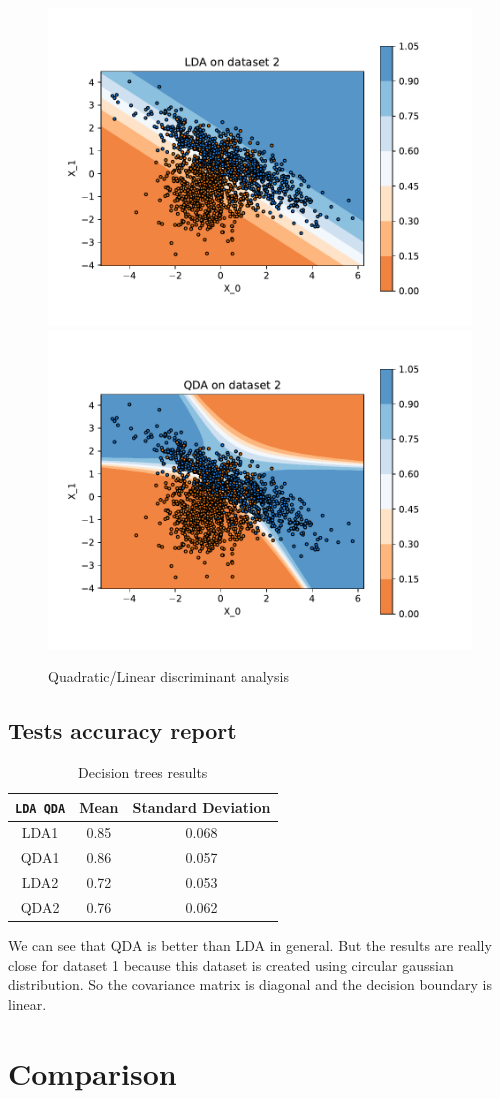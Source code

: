 \documentclass[12pt]{article}
\begin{document}
\begin{figure}[H]
	\centering
	\includegraphics[width=.4\textwidth]{img/lda2.pdf}\quad
	\includegraphics[width=.4\textwidth]{img/qda2.pdf}\quad
	
	\caption{Quadratic/Linear discriminant analysis}
	\label{fig:qdalda}
\end{figure}
\subsection{Tests accuracy report}
	\begin{table}[!h]
		\centering
		\begin{tabular}{|c|c|c|}
		\hline
		\verb|LDA QDA|                      & Mean & Standard Deviation \\ \hline
		LDA1                                & 0.85 & 0.068              \\ \hline
		QDA1                                & 0.86 & 0.057              \\ \hline
		LDA2                                & 0.72 & 0.053              \\ \hline
		QDA2                                & 0.76 & 0.062              \\ \hline
		\end{tabular}
		\caption{Decision trees results}
		\label{tab:results-qdalda}
	\end{table}

We can see that QDA is better than LDA in general. But the results are really close for dataset 1 because this dataset is created using circular gaussian distribution. 
So the covariance matrix is diagonal and the decision boundary is linear.
\section{Comparison}
\end{document}
